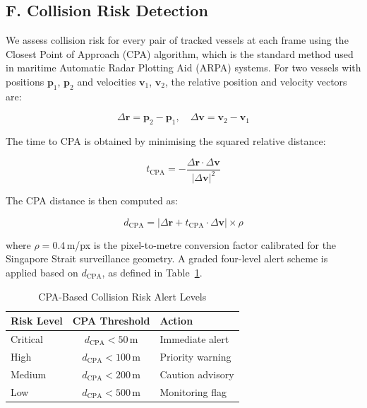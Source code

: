 \documentclass{ieeeaccess}
\begin{document}
\subsection*{F. Collision Risk Detection}

We assess collision risk for every pair of tracked vessels at each 
frame using the Closest Point of Approach (CPA) algorithm, which is 
the standard method used in maritime Automatic Radar Plotting Aid 
(ARPA) systems. For two vessels with positions $\mathbf{p}_1$, 
$\mathbf{p}_2$ and velocities $\mathbf{v}_1$, $\mathbf{v}_2$, the 
relative position and velocity vectors are:

\begin{equation}
\Delta\mathbf{r} = \mathbf{p}_2 - \mathbf{p}_1, \quad
\Delta\mathbf{v} = \mathbf{v}_2 - \mathbf{v}_1
\end{equation}

The time to CPA is obtained by minimising the squared relative 
distance:

\begin{equation}
t_{\text{CPA}} = -\frac{\Delta\mathbf{r} \cdot \Delta\mathbf{v}}
{|\Delta\mathbf{v}|^2}
\end{equation}

The CPA distance is then computed as:

\begin{equation}
d_{\text{CPA}} = |\Delta\mathbf{r} + t_{\text{CPA}} \cdot 
\Delta\mathbf{v}| \times \rho
\end{equation}

where $\rho = 0.4$\,m/px is the pixel-to-metre conversion factor 
calibrated for the Singapore Strait surveillance geometry. A graded 
four-level alert scheme is applied based on $d_{\text{CPA}}$, as 
defined in Table~\ref{tab:cpa}.

\begin{table}[H]
\centering
\caption{CPA-Based Collision Risk Alert Levels}
\label{tab:cpa}
\begin{tabular}{|l|c|l|}
\hline
\cellcolor{gray!30}\textbf{Risk Level} & 
\cellcolor{gray!30}\textbf{CPA Threshold} & 
\cellcolor{gray!30}\textbf{Action} \\
\hline
Critical & $d_{\text{CPA}} < 50$\,m   & Immediate alert \\
High     & $d_{\text{CPA}} < 100$\,m  & Priority warning \\
Medium   & $d_{\text{CPA}} < 200$\,m  & Caution advisory \\
Low      & $d_{\text{CPA}} < 500$\,m  & Monitoring flag \\
\hline
\end{tabular}
\end{table}
\end{document}
